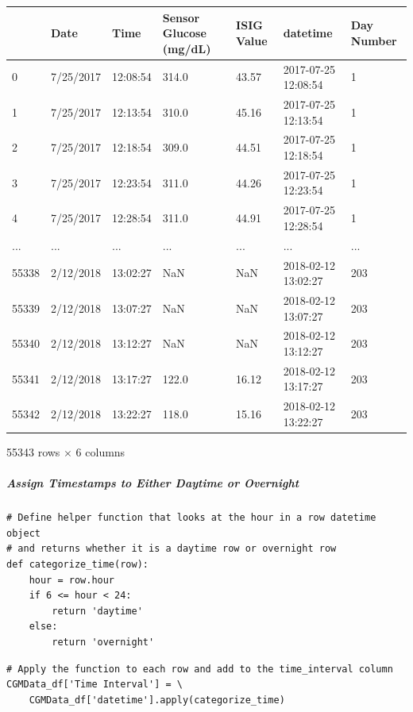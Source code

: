\bigskip\noindent
\begin{tabular}{p{}p{}p{}p{}p{}p{}p{}}
\toprule
 & Date & Time & Sensor Glucose (mg/dL) & ISIG Value & datetime & Day Number \\
\hline
0 & 7/25/2017 & 12:08:54 & 314.0 & 43.57 & 2017-07-25 12:08:54 & 1 \\
\hline
1 & 7/25/2017 & 12:13:54 & 310.0 & 45.16 & 2017-07-25 12:13:54 & 1 \\
\hline
2 & 7/25/2017 & 12:18:54 & 309.0 & 44.51 & 2017-07-25 12:18:54 & 1 \\
\hline
3 & 7/25/2017 & 12:23:54 & 311.0 & 44.26 & 2017-07-25 12:23:54 & 1 \\
\hline
4 & 7/25/2017 & 12:28:54 & 311.0 & 44.91 & 2017-07-25 12:28:54 & 1 \\
\hline
... & ... & ... & ... & ... & ... & ... \\
\hline
55338 & 2/12/2018 & 13:02:27 & NaN & NaN & 2018-02-12 13:02:27 & 203 \\
\hline
55339 & 2/12/2018 & 13:07:27 & NaN & NaN & 2018-02-12 13:07:27 & 203 \\
\hline
55340 & 2/12/2018 & 13:12:27 & NaN & NaN & 2018-02-12 13:12:27 & 203 \\
\hline
55341 & 2/12/2018 & 13:17:27 & 122.0 & 16.12 & 2018-02-12 13:17:27 & 203 \\
\hline
55342 & 2/12/2018 & 13:22:27 & 118.0 & 15.16 & 2018-02-12 13:22:27 & 203 \\
\hline
\bottomrule
\end{tabular}

\bigskip

55343 rows $\times$ 6 columns

\subparagraph{Assign Timestamps to Either Daytime or Overnight}

\begin{verbatim}
# Define helper function that looks at the hour in a row datetime object 
# and returns whether it is a daytime row or overnight row
def categorize_time(row):
    hour = row.hour
    if 6 <= hour < 24:
        return 'daytime'
    else:
        return 'overnight'
\end{verbatim}

\begin{verbatim}
# Apply the function to each row and add to the time_interval column
CGMData_df['Time Interval'] = \
    CGMData_df['datetime'].apply(categorize_time)
\end{verbatim}


